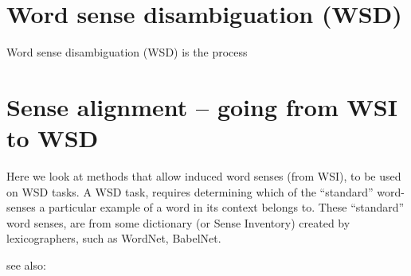\documentclass{article}
\begin{document}


\section{Word sense disambiguation (WSD)}
Word sense disambiguation (WSD) is the process

\section{Sense alignment -- going from WSI to WSD}
Here we look at methods that allow induced word senses (from WSI), to be used on WSD tasks.
A WSD task, requires determining which of the ``standard'' word-senses a particular example of a word in its context belongs to.
These ``standard'' word senses, are from some dictionary (or Sense Inventory) created by lexicographers, such as WordNet, BabelNet.


see also:
\end{document}
